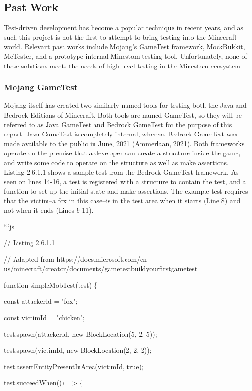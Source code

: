 \documentclass{article}
\begin{document}
\begin{onehalfspacing}
\subsection{Past Work}

Test-driven development has become a popular technique in recent years,
and as such this project is not the first to attempt to bring testing
into the Minecraft world. Relevant past works include Mojang's GameTest
framework, MockBukkit, McTester, and a prototype internal Minestom
testing tool. Unfortunately, none of these solutions meets the needs of
high level testing in the Minestom ecosystem.

\subsubsection{Mojang GameTest}

Mojang itself has created two similarly named tools for testing both the
Java and Bedrock Editions of Minecraft. Both tools are named GameTest,
so they will be referred to as Java GameTest and Bedrock GameTest for
the purpose of this report. Java GameTest is completely internal,
whereas Bedrock GameTest was made available to the public in June, 2021
(Ammerlaan, 2021). Both frameworks operate on the premise that a
developer can create a structure inside the game, and write some code to
operate on the structure as well as make assertions. Listing 2.6.1.1
shows a sample test from the Bedrock GameTest framework. As seen on
lines 14-16, a test is registered with a structure to contain the test,
and a function to set up the initial state and make assertions. The
example test requires that the victim--a fox in this case--is in the
test area when it starts (Line 8) and not when it ends (Lines 9-11).

```js

// Listing 2.6.1.1

// Adapted from
https://docs.microsoft.com/en-us/minecraft/creator/documents/gametestbuildyourfirstgametest

function simpleMobTest(test) \{

const attackerId = "fox";

const victimId = "chicken";

test.spawn(attackerId, new BlockLocation(5, 2, 5));

test.spawn(victimId, new BlockLocation(2, 2, 2));

test.assertEntityPresentInArea(victimId, true);

test.succeedWhen(() =\textgreater{} \{


\end{onehalfspacing}
\end{document}

